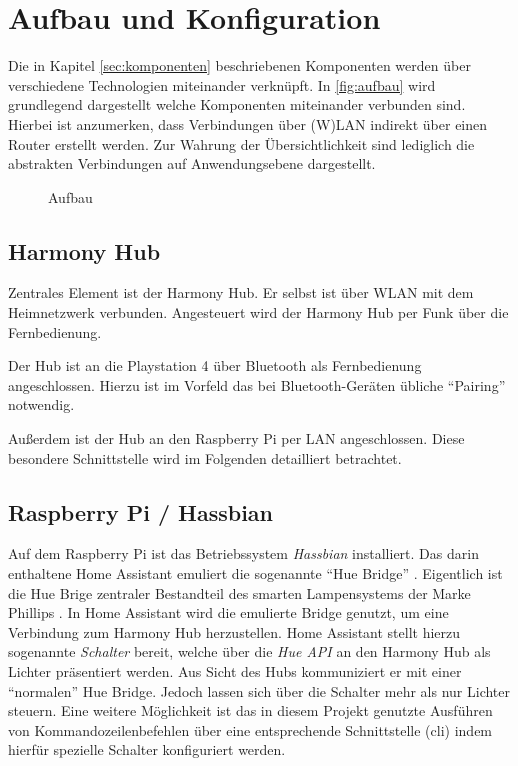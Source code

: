 \newpage
\section{Aufbau und Konfiguration}\label{sec:aufbau}
Die in Kapitel \ref{sec:komponenten} \textit{} beschriebenen
 Komponenten werden über verschiedene Technologien miteinander verknüpft.
In \autoref{fig:aufbau} wird grundlegend dargestellt welche Komponenten miteinander verbunden sind.
Hierbei ist anzumerken, dass Verbindungen über (W)LAN indirekt über einen Router erstellt werden.
Zur Wahrung der Übersichtlichkeit sind lediglich die abstrakten Verbindungen auf Anwendungsebene dargestellt.

\begin{figure}[ht!]
    \centering
    \resizebox{\textwidth}{!}{
        
    }
    \caption{Aufbau}
    \label{fig:aufbau}
\end{figure}

\subsection{Harmony Hub}\label{sec:aufbau-hub}
Zentrales Element ist der Harmony Hub.
Er selbst ist über WLAN mit dem Heimnetzwerk verbunden.
Angesteuert wird der Harmony Hub per Funk über die Fernbedienung.

Der Hub ist an die Playstation 4 über Bluetooth als Fernbedienung angeschlossen.
Hierzu ist im Vorfeld das bei Bluetooth-Geräten übliche \enquote{Pairing} notwendig.

Außerdem ist der Hub an den Raspberry Pi per LAN angeschlossen.
Diese besondere Schnittstelle wird im Folgenden detailliert betrachtet.

\subsection{Raspberry Pi / Hassbian}\label{sec:aufbau-hassbian}
Auf dem Raspberry Pi ist das Betriebssystem \textit{Hassbian} installiert.
Das darin enthaltene Home Assistant emuliert die sogenannte \enquote{Hue Bridge} \cite{Emulated83:online}.
Eigentlich ist die Hue Brige zentraler Bestandteil des smarten Lampensystems der Marke Phillips \cite{HueBridg65:online}.
In Home Assistant wird die emulierte Bridge genutzt, um eine Verbindung zum Harmony Hub herzustellen.
Home Assistant stellt hierzu sogenannte \textit{Schalter} bereit, welche über die \textit{Hue API} an den Harmony Hub als Lichter präsentiert werden.
Aus Sicht des Hubs kommuniziert er mit einer \enquote{normalen} Hue Bridge.
Jedoch lassen sich über die Schalter mehr als nur Lichter steuern.
Eine weitere Möglichkeit ist das in diesem Projekt genutzte Ausführen von Kommandozeilenbefehlen über eine entsprechende Schnittstelle (\ac{cli})
indem hierfür spezielle Schalter konfiguriert werden.

